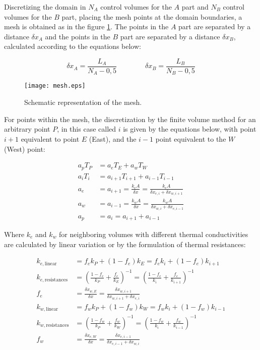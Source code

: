 Discretizing the domain in $N_A$ control volumes for the $A$ part and $N_B$ control volumes for the $B$ part, placing the mesh points at the domain boundaries, a mesh is obtained as in the figure \ref{fig:mesh}.
The points in the $A$ part are separated by a distance $\delta x_A$ and the points in the $B$ part are separated by a distance $\delta x_B$, calculated according to the equations below:

\begin{equation*}
    \delta x_A = \frac{L_A}{N_A - 0,5} \qquad\qquad \delta x_B = \frac{L_B}{N_B - 0,5}
\end{equation*}

\begin{figure}[h]
    \centering
    \texttt{[image: mesh.eps]}
    \caption{Schematic representation of the mesh.}
    \label{fig:mesh}
\end{figure}

For points within the mesh, the discretization by the finite volume method for an arbitrary point $P$, in this case called $i$ is given by the equations below, with point $i + 1$ equivalent to point $E$ (East), and the $i-1$ point equivalent to the $W$ (West) point:

\begin{align*}
    a_p T_P &= a_e T_E + a_w T_W \\
    a_i T_i &= a_{i+1} T_{i+1} + a_{i-1} T_{i-1} \\
    a_e &= a_{i+1} = \frac{k_e A}{\delta x} = \frac{k_e A}{\delta x_{e,i} + \delta x_{w,i+1}} \\
    a_w &= a_{i-1} = \frac{k_w A}{\delta x} = \frac{k_w A}{\delta x_{w,i} + \delta x_{e,i-1}}\\
    a_p &= a_i = a_{i+1} + a_{i-1}
\end{align*}

Where $k_e$ and $k_w$ for neighboring volumes with different thermal conductivities are calculated by linear variation or by the formulation of thermal resistances:

\begin{align*}
    k_{e, \text{linear}} &= f_e k_P + (1 - f_e) k_E = f_e k_i + (1 - f_e) k_{i+1} \\
    k_{e, \text{resistances}} &= \left(\frac{1 - f_e}{k_P} + \frac{f_e}{k_E} \right)^{-1} = \left(\frac{1 - f_e}{k_i} + \frac{f_e}{k_{i+1}} \right)^{-1} \\
    f_e &= \frac{\delta x_{w,E}}{\delta x} = \frac{\delta x_{w,i+1}}{\delta x_{w,i+1} + \delta x_{e,i}} \\
    k_{w, \text{linear}} &= f_w k_P + (1 - f_w) k_W = f_w k_i + (1 - f_w) k_{i-1} \\
    k_{w, \text{resistances}} &= \left(\frac{1 - f_w}{k_P} + \frac{f_w}{k_W} \right)^{-1} = \left(\frac{1 - f_w}{k_i} + \frac{f_w}{k_{i-1}} \right)^{-1} \\
    f_w &= \frac{\delta x_{e,W}}{\delta x} = \frac{\delta x_{e,i-1}}{\delta x_{e,i-1} + \delta x_{w,i}}
\end{align*}


